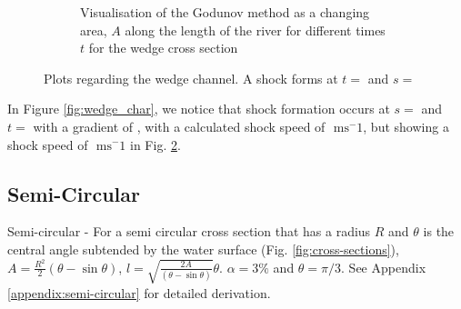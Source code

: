 \documentclass[12pt]{article}
\begin{document}
\begin{figure}[ht]
\begin{subfigure}[b]{0.49\textwidth}
        \caption{Visualisation of the Godunov method as a changing area, $A$ along the length of the river for different times $t$ for the wedge cross section}
        \label{fig:wedge_godunov}
    \end{subfigure}
    \caption{Plots regarding the wedge channel. A shock forms at $t = $ and $s = $}
\end{figure}

In Figure \ref{fig:wedge_char}, we notice that shock formation occurs at $s= $ and $t= $ with a gradient of , with a calculated shock speed of $ \text{ ms}^-1$, but showing a shock speed of $ \text{ ms}^-1$ in Fig. \ref{fig:wedge_godunov}.

\subsection{Semi-Circular}
Semi-circular - For a semi circular cross section that has a radius $R$ and $\theta$ is the central angle subtended by the water surface (Fig. \ref{fig:cross-sections}), $A = \frac{R^2}{2}\left(\theta - \sin\theta\right)$, $l = \sqrt{\frac{2A}{\left(\theta - \sin\theta\right)}}\theta$. $\alpha = 3\%$ and $\theta = \pi/3$. See Appendix \ref{appendix:semi-circular} for detailed derivation.
\end{document}
